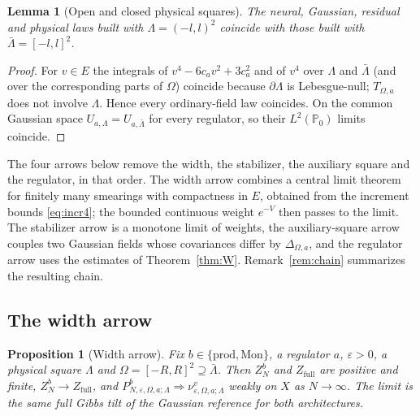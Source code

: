 \documentclass[11pt]{article}
\theoremstyle{plain}
\newtheorem{proposition}[theorem]{Proposition}
\newtheorem{lemma}[theorem]{Lemma}
\theoremstyle{definition}
\theoremstyle{remark}
\newcommand{\PP}{\mathbb{P}}
\newcommand{\bprod}{\mathrm{prod}}
\newcommand{\bMon}{\mathrm{Mon}}
\begin{document}
\begin{lemma}[Open and closed physical squares]\label{lem:openclosed}
The neural, Gaussian, residual and physical laws built with $\Lambda=(-l,l)^{2}$
coincide with those built with $\bar\Lambda=[-l,l]^{2}$.
\end{lemma}

\begin{proof}
For $v\in E$ the integrals of $v^{4}-6c_av^{2}+3c_a^{2}$ and of $v^{4}$ over $\Lambda$ and
$\bar\Lambda$ (and over the corresponding parts of $\Omega$) coincide because
$\partial\Lambda$ is Lebesgue-null; $T_{\Omega,a}$ does not involve $\Lambda$. Hence every
ordinary-field law coincides. On the common Gaussian space $U_{a,\Lambda}=U_{a,\bar\Lambda}$
for every regulator, so their $L^{2}(\PP_0)$ limits coincide.
\end{proof}

The four arrows below remove the width, the stabilizer, the auxiliary square and the regulator, in that order. The width arrow combines a central limit theorem for finitely many smearings with compactness in $E$, obtained from the increment bounds \eqref{eq:incr4}; the bounded continuous weight $e^{-V}$ then passes to the limit. The stabilizer arrow is a monotone limit of weights, the auxiliary-square arrow couples two Gaussian fields whose covariances differ by $\Delta_{\Omega,a}$, and the regulator arrow uses the estimates of Theorem~\ref{thm:W}. Remark~\ref{rem:chain} summarizes the resulting chain.

\subsection{The width arrow}

\begin{proposition}[Width arrow]\label{prop:width}
Fix $b\in\{\bprod,\bMon\}$, a regulator $a$, $\varepsilon>0$, a physical square $\Lambda$ and
$\Omega=[-R,R]^{2}\supseteq\bar\Lambda$. Then $Z^{b}_{N}$ and $Z_{\mathrm{full}}$ are positive and
finite, $Z^{b}_{N}\to Z_{\mathrm{full}}$, and
$P^{b}_{N,\varepsilon,\Omega,a;\Lambda}\Rightarrow\nu^{v}_{\varepsilon,\Omega,a;\Lambda}$ weakly on $X$ as
$N\to\infty$. The limit is the same full Gibbs tilt of the Gaussian reference for
both architectures.
\end{proposition}
\end{document}
